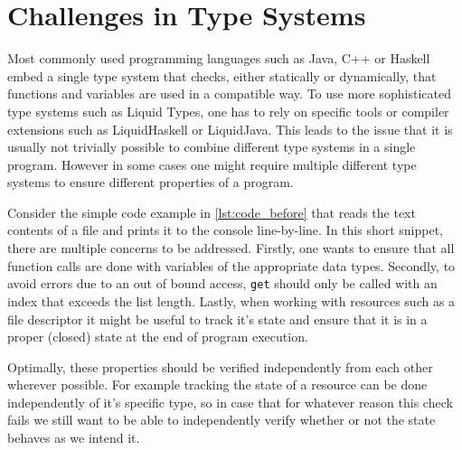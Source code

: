 \documentclass{easychair}
\begin{document}
\section{Challenges in Type Systems}
\label{sec:challenges-in-type-systems}
Most commonly used programming languages such as Java, C++ or Haskell embed a single type system that checks, either statically or dynamically, that functions and variables are used in a compatible way. To use more sophisticated type systems such as Liquid Types, one has to rely on specific tools or compiler extensions such as LiquidHaskell\cite{LiquidHaskell} or LiquidJava\cite{LiquidJava}. This leads to the issue that it is usually not trivially possible to combine different type systems in a single program. However in some cases one might require multiple different type systems to ensure different properties of a program.

Consider the simple code example in \autoref{lst:code_before} that reads the text contents of a file and prints it to the console line-by-line. In this short snippet, there are multiple concerns to be addressed. Firstly, one wants to ensure that all function calls are done with variables of the appropriate data types. Secondly, to avoid errors due to an out of bound access, \texttt{get} should only be called with an index that exceeds the list length. Lastly, when working with resources such as a file descriptor it might be useful to track it's state and ensure that it is in a proper (closed) state at the end of program execution.

Optimally, these properties should be verified independently from each other wherever possible. For example tracking the state of a resource can be done independently of it's specific type, so in case that for whatever reason this check fails we still want to be able to independently verify whether or not the state behaves as we intend it.
\end{document}
